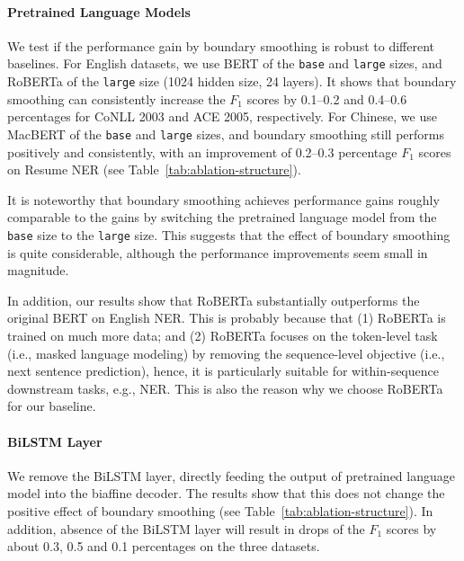 \documentclass[11pt]{article}
\begin{document}
\paragraph{Pretrained Language Models} We test if the performance gain by boundary smoothing is robust to different baselines. For English datasets, we use BERT \citep{devlin-etal-2019-bert} of the \texttt{base} and \texttt{large} sizes, and RoBERTa \citep{liu2019roberta} of the \texttt{large} size (1024 hidden size, 24 layers). It shows that boundary smoothing can consistently increase the $F_1$ scores by 0.1--0.2 and 0.4--0.6 percentages for CoNLL 2003 and ACE 2005, respectively. For Chinese, we use MacBERT \citep{cui-etal-2020-revisiting} of the \texttt{base} and \texttt{large} sizes, and boundary smoothing still performs positively and consistently, with an improvement of 0.2--0.3 percentage $F_1$ scores on Resume NER (see Table~\ref{tab:ablation-structure}). 

It is noteworthy that boundary smoothing achieves performance gains roughly comparable to the gains by switching the pretrained language model from the \texttt{base} size to the \texttt{large} size. This suggests that the effect of boundary smoothing is quite considerable, although the performance improvements seem small in magnitude. 

In addition, our results show that RoBERTa substantially outperforms the original BERT on English NER. This is probably because that (1) RoBERTa is trained on much more data; and (2) RoBERTa focuses on the token-level task (i.e., masked language modeling) by removing the sequence-level objective (i.e., next sentence prediction), hence, it is particularly suitable for within-sequence downstream tasks, e.g., NER. This is also the reason why we choose RoBERTa for our baseline. 


\paragraph{BiLSTM Layer} We remove the BiLSTM layer, directly feeding the output of pretrained language model into the biaffine decoder. The results show that this does not change the positive effect of boundary smoothing (see Table~\ref{tab:ablation-structure}). In addition, absence of the BiLSTM layer will result in drops of the $F_1$ scores by about 0.3, 0.5 and 0.1 percentages on the three datasets. 
\end{document}
